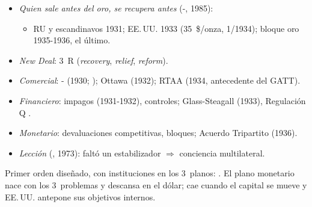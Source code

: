 \documentclass{article}
\begin{document}
\begin{columnas}
\begin{itemize}
\item \emph{Quien sale antes del oro, se recupera antes} (-, 1985):
  \begin{itemize}
  \item RU y escandinavos 1931; EE.\,UU. 1933 (35~\$/onza, 1/1934); bloque oro 1935-1936, el último.
  \end{itemize}
\item \emph{New Deal}: 3~R (\emph{recovery}, \emph{relief}, \emph{reform}).
\item \emph{Comercial}: - (1930; ); Ottawa (1932); RTAA (1934, antecedente del GATT).
\item \emph{Financiero}: impagos (1931-1932), controles; Glass-Steagall (1933), Regulación Q .
\item \emph{Monetario}: devaluaciones competitivas, bloques; Acuerdo Tripartito (1936).
\item \emph{Lección} (, 1973): faltó un estabilizador $\Rightarrow$ conciencia multilateral.
\end{itemize}

\begin{ideaclave}
Primer orden diseñado, con instituciones en los 3~planos: . El plano monetario nace con los 3~problemas y descansa en el dólar; cae cuando el capital se mueve y EE.\,UU. antepone sus objetivos internos.
\end{ideaclave}


\end{columnas}
\end{document}
